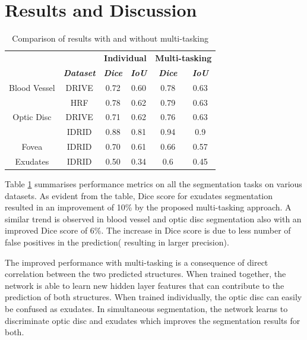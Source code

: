 \documentclass{article}
\begin{document}
\section{Results and Discussion}\label{sec:results}


\begin{table}[htbp]
\caption{Comparison of results with and without multi-tasking}
\begin{center}
\begin{tabular}{|c|c|c|c|c|c|}
\hline
&&\multicolumn{2}{|c|}{\textbf{Individual}}& \multicolumn{2}{|c|}{\textbf{Multi-tasking}} \\
\cline{3-6}
 &\textbf{\textit{Dataset}}& \textbf{\textit{Dice}}& \textbf{\textit{IoU}}& \textbf{\textit{Dice}}& \textbf{\textit{IoU}}  \\
\hline
Blood Vessel&DRIVE &0.72&0.60 &0.78&0.63  \\
\cline{2-6}
&HRF&0.78&0.62&0.79&0.63 \\
\hline
Optic Disc& DRIVE&0.71&0.62 &0.76&0.63  \\
\cline{2-6}
&IDRID&0.88&0.81&0.94&0.9 \\
\hline
Fovea&IDRID&0.70&0.61 &0.66 &0.57  \\
\hline
Exudates&IDRID&0.50&0.34 &0.6&0.45  \\
\hline
\end{tabular}
\label{tab:results}
\end{center}
\end{table}

Table \ref{tab:results} summarises performance metrics on all the segmentation tasks on various datasets.
As evident from the table,  Dice score for exudates segmentation resulted in an improvement  of 10\% by the proposed multi-tasking approach.
A similar trend is observed in blood vessel and optic disc segmentation also with an improved Dice score of 6\%.
The increase in Dice score is due to less number of false positives in the prediction( resulting in larger precision).


The improved performance with multi-tasking is a consequence of direct correlation between the two predicted structures.
When trained together, the network is able to learn new hidden layer features that can contribute to the prediction of both structures.
When trained individually, the optic disc can easily be confused as exudates.
In simultaneous segmentation, the network learns to discriminate optic disc and exudates which improves the segmentation results for both.
\end{document}
